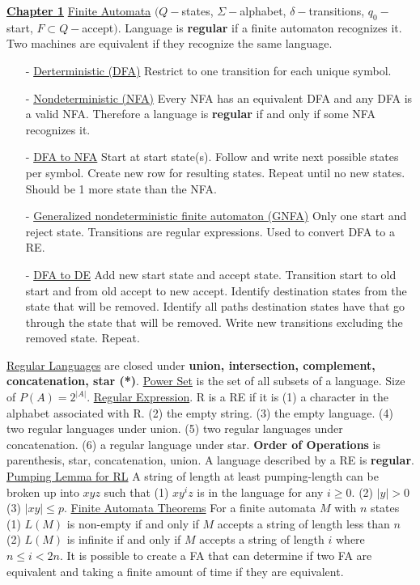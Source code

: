 \documentclass[9pt]{article}
\begin{document}
\noindent\uline{\textbf{Chapter 1}}\newline
\uline{Finite Automata} $(Q - $states, $\Sigma - $alphabet, $ \delta - $transitions,
$q_0 - $start, $F\subset Q - $accept$)$. Language is \textbf{regular} if a finite 
automaton recognizes it. Two machines are equivalent if they recognize the same
language.
\begin{itemize}[noitemsep, topsep=0pt]
    \item[-]\uline{Derterministic (DFA)} Restrict to one transition for each unique 
    symbol.
    \item[-]\uline{Nondeterministic (NFA)} Every NFA has an equivalent DFA and any 
    DFA is a valid NFA. Therefore a language is \textbf{regular} if and only if some 
    NFA recognizes it. 
    \item[-]\uline{DFA to NFA} Start at start state(s). Follow and write next possible 
    states per symbol. Create new row for resulting states. Repeat until no new states.
    Should be 1 more state than the NFA.
    \item[-]\uline{Generalized nondeterministic finite automaton (GNFA)} Only one start
    and reject state. Transitions are regular expressions. Used to convert DFA to a RE.
    \item[-]\uline{DFA to DE} Add new start state and accept state. Transition start 
    to old start and from old accept to new accept. Identify destination states from 
    the state that will be removed. Identify all paths destination states have that go
    through the state that will be removed. Write new transitions excluding the removed
    state. Repeat.
\end{itemize}
\uline{Regular Languages} are closed under \textbf{union, intersection, complement, 
concatenation, star (*)}.\newline
\uline{Power Set} is the set of all subsets of a language. Size of $P(A) = 2^{|A|}$. 
\newline
\uline{Regular Expression}. R is a RE if it is (1) a character in the alphabet 
associated with R. (2) the empty string. (3) the empty language. (4) two regular 
languages under union. (5) two regular languages under concatenation. (6) a regular 
language under star. \textbf{Order of Operations} is parenthesis, star, concatenation,
union. A language described by a RE is \textbf{regular}.\newline
\uline{Pumping Lemma for RL} A string of length at least pumping-length can be broken
up into $xyz$ such that (1) $xy^iz$ is in the language for any $i\geq 0$. (2) $|y|>0$
(3) $|xy| \leq p$.\newline
\uline{Finite Automata Theorems} For a finite automata $M$ with $n$ states (1) $L(M)$ 
is non-empty if and only if $M$ accepts a string of length less than $n$ (2) $L(M)$ is 
infinite if and only if $M$ accepts a string of length $i$ where $n\leq i < 2n$. It is
possible to create a FA that can determine if two FA are equivalent and taking a 
finite amount of time if they are equivalent.
\end{document}
